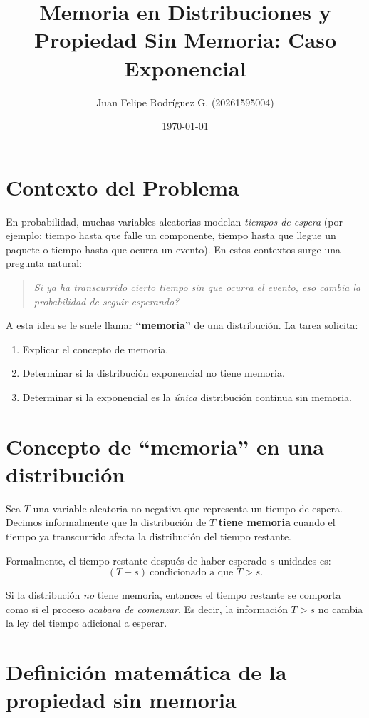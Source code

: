 \documentclass{article}
\title{Memoria en Distribuciones y Propiedad Sin Memoria: Caso Exponencial}
\author{Juan Felipe Rodr\'iguez G. (20261595004)}
\date{\today}
\theoremstyle{plain}
\theoremstyle{definition}
\begin{document}
\maketitle

\section*{Contexto del Problema}

En probabilidad, muchas variables aleatorias modelan \emph{tiempos de espera} (por ejemplo: tiempo hasta que falle un componente, tiempo hasta que llegue un paquete o tiempo hasta que ocurra un evento). En estos contextos surge una pregunta natural:

\begin{quote}
\emph{Si ya ha transcurrido cierto tiempo sin que ocurra el evento, \textquestiondown eso cambia la probabilidad de seguir esperando?}
\end{quote}

A esta idea se le suele llamar \textbf{``memoria''} de una distribución. La tarea solicita:
\begin{enumerate}
    \item Explicar el concepto de memoria.
    \item Determinar si la distribución exponencial no tiene memoria.
    \item Determinar si la exponencial es la \emph{única} distribución continua sin memoria.
\end{enumerate}

\section*{Concepto de ``memoria'' en una distribución}

Sea $T$ una variable aleatoria no negativa que representa un tiempo de espera. Decimos informalmente que la distribución de $T$ \textbf{tiene memoria} cuando el tiempo ya transcurrido afecta la distribución del tiempo restante.

Formalmente, el tiempo restante después de haber esperado $s$ unidades es:
$$ (T - s) \ \text{condicionado a que } T > s. $$

Si la distribución \emph{no} tiene memoria, entonces el tiempo restante se comporta como si el proceso \emph{acabara de comenzar}. Es decir, la información \(T > s\) no cambia la ley del tiempo adicional a esperar.

\section*{Definición matemática de la propiedad sin memoria}
\end{document}
